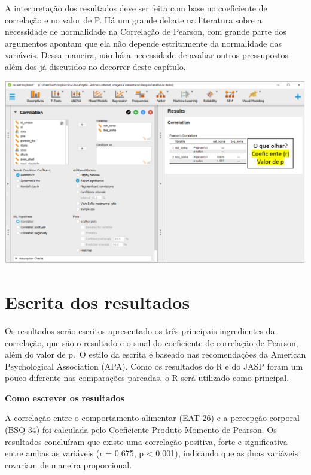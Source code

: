 \documentclass[
]{book}
\begin{document}
A interpretação dos resultados deve ser feita com base no coeficiente de correlação e no valor de P. Há um grande debate na literatura sobre a necessidade de normalidade na Correlação de Pearson, com grande parte dos argumentos apontam que ela não depende estritamente da normalidade das variáveis. Dessa maneira, não há a necessidade de avaliar outros pressupostos além dos já discutidos no decorrer deste capítulo.

\includegraphics{./img/cap_correlacao_resultados.png}

\hypertarget{escrita-dos-resultados-11}{%
\section{Escrita dos resultados}\label{escrita-dos-resultados-11}}

Os resultados serão escritos apresentado os três principais ingredientes da correlação, que são o resultado e o sinal do coeficiente de correlação de Pearson, além do valor de p.~O estilo da escrita é baseado nas recomendações da American Psychological Association (APA). Como os resultados do R e do JASP foram um pouco diferente nas comparações pareadas, o R será utilizado como principal.

\begin{writing}
\textbf{Como escrever os resultados}

A correlação entre o comportamento alimentar (EAT-26) e a percepção
corporal (BSQ-34) foi calculada pelo Coeficiente Produto-Momento de
Pearson. Os resultados concluíram que existe uma correlação positiva,
forte e significativa entre ambas as variáveis (r = 0.675, p \textless{}
0.001), indicando que as duas variáveis covariam de maneira
proporcional.
\end{writing}
\end{document}
